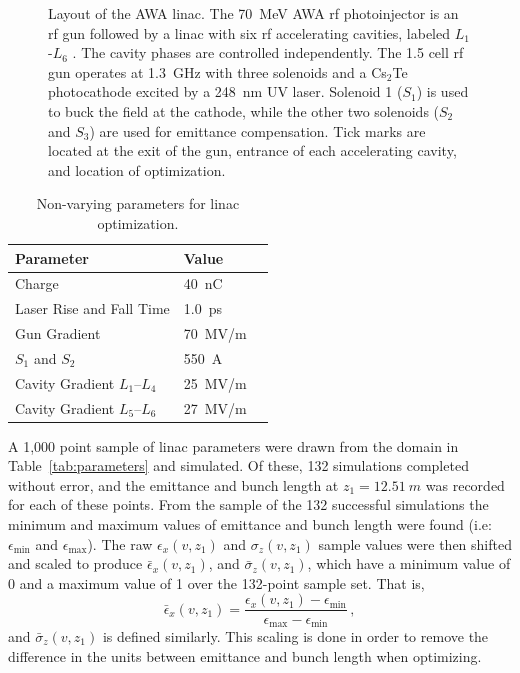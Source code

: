 \begin{figure}
\begin{center}
	\end{center}
	\caption{Layout of the AWA linac. The \SI{70}{MeV} AWA rf photoinjector 
		is an rf gun followed by a linac with six rf accelerating cavities, 
		labeled $L_1$-$L_6$ \cite{Power:2010zza}.  The cavity phases are controlled independently. 
		The 1.5 cell rf gun operates at \SI{1.3}{GHz} with three solenoids 
		and a Cs$_{2}$Te photocathode excited by a \SI{248}{nm} UV laser.  
		Solenoid 1 ($S_1$) is used to buck the field at the cathode,
		while the other two solenoids ($S_2$ and $S_3$) are used for emittance compensation.  
		Tick marks are located at the exit of the gun, entrance of
		each accelerating cavity, and location of optimization.}
	\label{fig:beamline} 
\end{figure} 
\begin{table}%
	\caption{\label{tab:linac} Non-varying parameters for linac optimization.}
	\begin{center}
		\begin{tabular}{lll}
			\toprule
			\toprule
			\textbf{Parameter} & \textbf{Value} \\
			\midrule
			Charge  & \SI{40}{nC} \\
			Laser Rise and Fall Time & \SI{1.0}{ps} \\
			Gun Gradient & \SI{70}{MV/m} \\
			$S_1$ and $S_2$ & \SI{550}{A}\\
			Cavity Gradient $L_1$--$L_4$ & \SI{25}{MV/m} \\
			Cavity Gradient $L_5$--$L_6$ & \SI{27}{MV/m} \\
			\bottomrule
		\end{tabular}
	\end{center}
\end{table}

A 1,000 point sample of linac parameters were drawn from the domain
in Table~\ref{tab:parameters} and simulated. Of these, 132 simulations completed
without error, and the emittance and bunch length at $z_1=\SI{12.51}{m}$ was
recorded for each of these points. From the sample of the 132 successful simulations 
the minimum and maximum values of emittance and bunch length
were found (i.e: $\epsilon_{\min}$ and $\epsilon_{\max}$). 
The raw $\epsilon_x(v,z_1)$ and $\sigma_z(v,z_1)$ sample values were then
shifted and scaled to produce $\bar{\epsilon}_x(v,z_1)$, and $\bar{\sigma}_z(v,z_1)$,
which have a minimum value of 0 and a maximum value of 1 over the 132-point sample set. That is, 
\begin{equation}
\bar{\epsilon}_x (v,z_1) = \frac{ \epsilon_x (v,z_1) - \epsilon_{\min} } { \epsilon_{\max} - \epsilon_{\min} }\, ,
\label{eq:scale}
\end{equation} 
and $\bar{\sigma}_z (v,z_1)$ is defined similarly.
This scaling is done in order to remove the difference in the units between
emittance and bunch length when optimizing.


